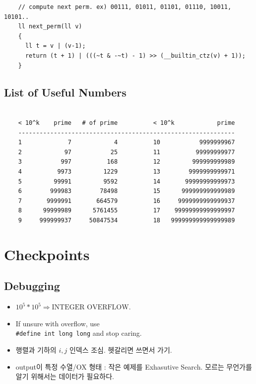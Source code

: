 \documentclass[landscape,8pt]{article}
\begin{document}
\begin{multicols}{2}
\begin{verbatim}
    // compute next perm. ex) 00111, 01011, 01101, 01110, 10011, 10101..
    ll next_perm(ll v)
    {
      ll t = v | (v-1);
      return (t + 1) | (((~t & -~t) - 1) >> (__builtin_ctz(v) + 1));
    }
  \end{verbatim}
  \subsection{List of Useful Numbers}
  \begin{verbatim}

    < 10^k    prime   # of prime          < 10^k            prime
    -------------------------------------------------------------
    1             7            4          10           9999999967
    2            97           25          11          99999999977
    3           997          168          12         999999999989
    4          9973         1229          13        9999999999971
    5         99991         9592          14       99999999999973
    6        999983        78498          15      999999999999989
    7       9999991       664579          16     9999999999999937
    8      99999989      5761455          17    99999999999999997
    9     999999937     50847534          18   999999999999999989
  \end{verbatim}
\columnbreak


\section{Checkpoints}
  \subsection{Debugging}
\begin{itemize}
  \item $10^5 * 10^5 \Rightarrow \text{INTEGER OVERFLOW}$.
  \item If unsure with overflow, use \\
  \texttt{\#define int long long} and stop caring.
  \item 행렬과 기하의 $i, j$ 인덱스 조심. 헷갈리면 쓰면서 가기.
  \item output이 특정 수열/OX 형태 : 작은 예제를 Exhasutive Search. 모르는 무언가를 알기 위해서는 데이터가 필요하다.
\end{itemize}

\end{multicols}
\end{document}
